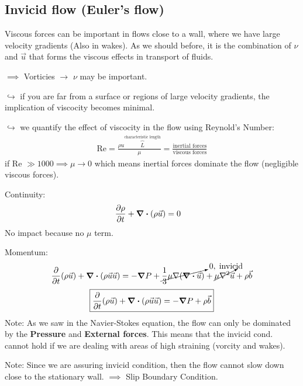 \subsection*{Invicid flow (Euler's flow)}
Viscous forces can be important in flows close to a wall, where we have large velocity gradients (Also in wakes).
As we should before, it is the combination of $\nu$ and $\vec{u}$ that forms the viscous effects in transport of fluids. 

$\implies$ Vorticies $\to$ $\nu$ may be important.

$\hookrightarrow$ if you are far from a surface or regions of large velocity gradients, the implication of viscocity becomes minimal.

$\hookrightarrow$ we quantify the effect of viscocity in the flow using Reynold's Number:
\begin{align*}
    \text{Re} = \frac{\rho u \overbrace{L}^{\text{characteristic length}}}{\mu} 
    = \frac{\text{inertial forces}}{\text{viscous forces}}
\end{align*}
if Re $\gg 1000 \implies \mu \to 0$ which means inertial forces dominate the flow 
(negligible viscous forces).

Continuity:
\begin{align*}
    \frac{\partial \rho}{\partial t} + \divergence (\rho \vec{u}) &= 0 
\end{align*}
No impact because no $\mu$ term.

Momentum:
\begin{align*}
    \frac{\partial}{\partial t} (\rho \vec{u}) + \divergence (\rho \vec{u} \vec{u}) &=
    - \grad P + \cancelto{0, \;\text{invicid}}{\frac{1}{3}\mu \nabla(\divergence \vec{u})}
    + \cancelto{}{\mu \laplacian \vec{u}} + \rho \vec{b} \\
\end{align*}
\begin{align*}
    \boxed{\frac{\partial}{\partial t} (\rho \vec{u}) + \divergence (\rho \vec{u} \vec{u}) =
    - \grad P + \rho \vec{b}}
\end{align*}
Note: As we saw in the Navier-Stokes equation, the flow can only be dominated by the 
\textbf{Pressure} and \textbf{External forces}. This means that the invicid cond. cannot hold if we 
are dealing with areas of high straining (vorcity and wakes).

Note: Since we are assuring invicid condition, then the flow cannot slow down close to the 
stationary wall. $\implies$ Slip Boundary Condition.

